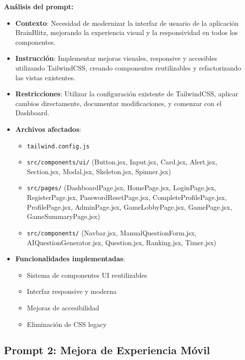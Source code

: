 \documentclass[12pt,a4paper]{article}
\begin{document}
\textbf{Análisis del prompt:}
\begin{itemize}
    \item \textbf{Contexto}: Necesidad de modernizar la interfaz de usuario de la aplicación BrainBlitz, mejorando la experiencia visual y la responsividad en todos los componentes.
    
    \item \textbf{Instrucción}: Implementar mejoras visuales, responsive y accesibles utilizando TailwindCSS, creando componentes reutilizables y refactorizando las vistas existentes.
    
    \item \textbf{Restricciones}: Utilizar la configuración existente de TailwindCSS, aplicar cambios directamente, documentar modificaciones, y comenzar con el Dashboard.
    
    \item \textbf{Archivos afectados}:
    \begin{itemize}
        \item \texttt{tailwind.config.js}
        \item \texttt{src/components/ui/} (Button.jsx, Input.jsx, Card.jsx, Alert.jsx, Section.jsx, Modal.jsx, Skeleton.jsx, Spinner.jsx)
        \item \texttt{src/pages/} (DashboardPage.jsx, HomePage.jsx, LoginPage.jsx, RegisterPage.jsx, PasswordResetPage.jsx, CompleteProfilePage.jsx, ProfilePage.jsx, AdminPage.jsx, GameLobbyPage.jsx, GamePage.jsx, GameSummaryPage.jsx)
        \item \texttt{src/components/} (Navbar.jsx, ManualQuestionForm.jsx, AIQuestionGenerator.jsx, Question.jsx, Ranking.jsx, Timer.jsx)
    \end{itemize}
    
    \item \textbf{Funcionalidades implementadas}:
    \begin{itemize}
        \item Sistema de componentes UI reutilizables
        \item Interfaz responsive y moderna
        \item Mejoras de accesibilidad
        \item Eliminación de CSS legacy
    \end{itemize}
\end{itemize}

\subsection{Prompt 2: Mejora de Experiencia Móvil}
\end{document}
